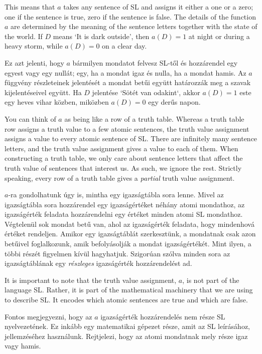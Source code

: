 

This means that $a$ takes any sentence of SL and assigns it either a one or a zero; one if the sentence is true, zero if the sentence is false. The details of the function $a$ are determined by the meaning of the sentence letters together with the state of the world. If $D$ means `It is dark outside', then $a(D)=1$ at night or during a heavy storm, while $a(D)=0$ on a clear day.

Ez azt jelenti, hogy $a$ bármilyen mondatot felvesz SL-től és hozzárendel egy egyest vagy egy nullát; egy, ha a mondat igaz és nulla, ha a mondat hamis. Az $a$ függvény részleteinek jelentését a mondat betűi együtt határozzák meg a szavak kijelentéseivel együtt. Ha $D$ jelentése `Sötét van odakint`, akkor $a(D)=1$ este egy heves vihar közben, miközben $a(D)=0$ egy derűs napon.

You can think of $a$ as being like a row of a truth table. Whereas a truth table row assigns a truth value to a few atomic sentences, the truth value assignment assigns a value to every atomic sentence of SL. There are infinitely many sentence letters, and the truth value assignment gives a value to each of them. When constructing a truth table, we only care about sentence letters that affect the truth value of sentences that interest us. As such, we ignore the rest. Strictly speaking, every row of a truth table gives a \emph{partial} truth value assignment.

$a$-ra gondolhatunk úgy is, mintha egy igazságtábla sora lenne. Mivel az igazságtábla sora hozzárendel egy igazságértéket néhány atomi mondathoz, az igazságérték feladata hozzárendelni egy értéket minden atomi SL mondathoz. Végtelenül sok mondat betű van, ahol az igazságérték feladata, hogy mindenhová értéket rendeljen. Amikor egy igazságtáblát szerkesztünk, a mondatnak csak azon betűivel foglalkozunk, amik befolyásolják a mondat igazságértékét. Mint ilyen, a többi részét figyelmen kívül hagyhatjuk. Szigorúan szólva minden sora az igazságtáblának egy \emph{részleges} igazságérték hozzárendelést ad.

It is important to note that the truth value assignment, $a$, is not part of the language SL. Rather, it is part of the mathematical machinery that we are using to describe SL. It encodes which atomic sentences are true and which are false.

Fontos megjegyezni, hogy az $a$ igazságérték hozzárendelés nem része SL nyelvezetének. Ez inkább egy matematikai gépezet része, amit az SL leírásához, jellemzéséhez használunk. Rejtjelezi, hogy az atomi mondatnak mely része igaz vagy hamis.


